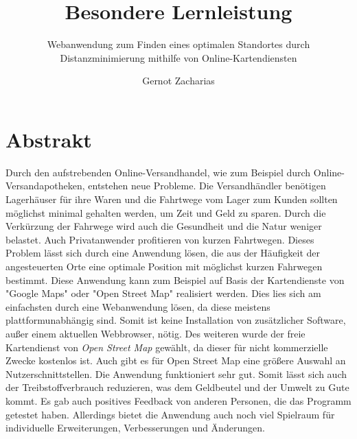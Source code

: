\documentclass[a4paper, 12pt]{scrreprt}
\title{Besondere Lernleistung}
\author{Gernot Zacharias}
\subtitle{Webanwendung zum Finden eines optimalen Standortes durch Distanzminimierung mithilfe von Online-Kartendiensten}
\begin{document}
\maketitle
\cleardoublepage
\chapter*{Abstrakt}
Durch den aufstrebenden Online-Versandhandel, wie zum Beispiel durch Online-Versandapotheken, entstehen neue Probleme.
Die Versandhändler benötigen Lagerhäuser für ihre Waren und die Fahrtwege vom Lager zum Kunden sollten möglichst minimal gehalten werden, um Zeit und Geld zu sparen.
Durch die Verkürzung der Fahrwege wird auch die Gesundheit und die Natur weniger belastet.
Auch Privatanwender profitieren von kurzen Fahrtwegen.
Dieses Problem lässt sich durch eine Anwendung lösen, die aus der Häufigkeit der angesteuerten Orte eine optimale Position mit möglichst kurzen Fahrwegen bestimmt.
Diese Anwendung kann zum Beispiel auf Basis der Kartendienste von "Google Maps" oder "Open Street Map" realisiert werden.
Dies lies sich am einfachsten durch eine Webanwendung lösen, da diese meistens plattformunabhängig sind.
Somit ist keine Installation von zusätzlicher Software, außer einem aktuellen Webbrowser, nötig.
Des weiteren wurde der freie Kartendienst von \emph{Open Street Map} gewählt, da dieser für nicht kommerzielle Zwecke kostenlos ist.
Auch gibt es für Open Street Map eine größere Auswahl an Nutzerschnittstellen.
Die Anwendung funktioniert sehr gut.%
Somit lässt sich auch der Treibstoffverbrauch reduzieren, was dem Geldbeutel und der Umwelt zu Gute kommt.
Es gab auch positives Feedback von anderen Personen, die das Programm getestet haben.
Allerdings bietet die Anwendung auch noch viel Spielraum für individuelle Erweiterungen, Verbesserungen und Änderungen.
\setcounter{page}{1}
\tableofcontents
\end{document}
